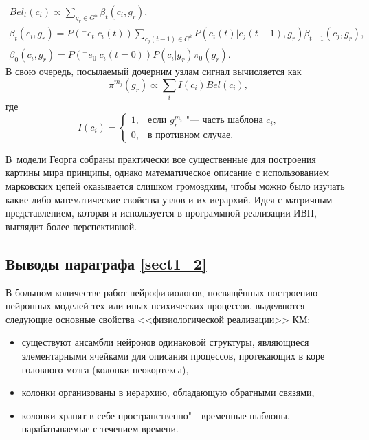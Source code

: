 \begin{equation}
	\begin{split}
		Bel_t(c_i)\varpropto\sum_{g_r\in G^k}\beta_t(c_i,g_r),\\
		\beta_t(c_i,g_r)=P({}^-e_t|c_i(t))\sum_{c_j(t-1)\in C^k}P(c_i(t)|c_j(t-1),g_r)\beta_{t-1}(c_j,g_r),\\
		\beta_0(c_i,g_r)=P({}^-e_0|c_i(t=0))P(c_i|g_r)\pi_0(g_r).
	\end{split}
\end{equation}
В свою очередь, посылаемый дочерним узлам сигнал вычисляется как
\begin{equation}
	\pi^{m_j}(g_r)\varpropto\sum_i I(c_i)Bel(c_i),
\end{equation}
где
\begin{equation}
	I(c_i)=
	\begin{cases}
		1, & \text{если $g_r^{m_i}$ "--- часть шаблона $c_i$,}\\
		0, & \text{в противном случае.}
	\end{cases}
\end{equation}

В~модели Георга собраны практически все существенные для построения картины мира принципы, однако математическое описание с использованием марковских цепей оказывается слишком громоздким, чтобы можно было изучать какие-либо математические свойства узлов и их иерархий. Идея с матричным представлением, которая и используется в программной реализации ИВП, выглядит более перспективной.

\subsection{Выводы параграфа \ref{sect1_2}}

В большом количестве работ нейрофизиологов, посвящённых построению нейронных моделей тех или иных психических процессов, выделяются следующие основные свойства <<физиологической реализации>> КМ:
\begin{itemize}
	\item существуют ансамбли нейронов одинаковой структуры, являющиеся элементарными ячейками для описания процессов, протекающих в коре головного мозга (колонки неокортекса),
	\item колонки организованы в иерархию, обладающую обратными связями,
	\item колонки хранят в себе пространственно"--~временные шаблоны, нарабатываемые с течением времени.
\end{itemize}

